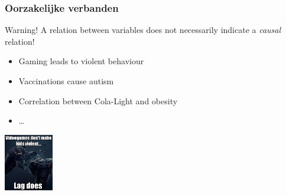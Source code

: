 \documentclass{beamer}
\begin{document}
\begin{frame}
  \frametitle{Oorzakelijke verbanden}

  \begin{alertblock}{Warning!}
      A relation between variables does not necessarily indicate a \emph{causal} relation!
  \end{alertblock}

  \begin{itemize}
    \item Gaming leads to violent behaviour
    \item Vaccinations cause autism
    \item Correlation between Cola-Light and obesity
    \item \ldots
  \end{itemize}

  \begin{center}
    \includegraphics[height=2.5cm]{img/les1-10}
  \end{center}
\end{frame}
\end{document}

